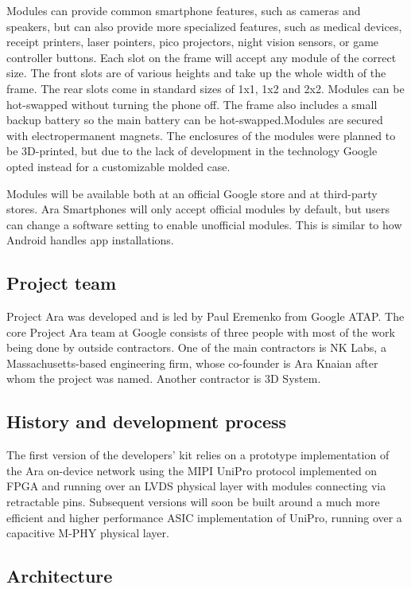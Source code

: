 Modules can provide common smartphone features, such as cameras and speakers, but can also provide more specialized features, such as medical devices, receipt printers, laser pointers, pico projectors, night vision sensors, or game controller buttons. Each slot on the frame will accept any module of the correct size. The front slots are of various heights and take up the whole width of the frame. The rear slots come in standard sizes of 1x1, 1x2 and 2x2. Modules can be hot-swapped without turning the phone off. The frame also includes a small backup battery so the main battery can be hot-swapped.Modules are secured with electropermanent magnets. The enclosures of the modules were planned to be 3D-printed, but due to the lack of development in the technology Google opted instead for a customizable molded case.

Modules will be available both at an official Google store and at third-party stores. Ara Smartphones will only accept official modules by default, but users can change a software setting to enable unofficial modules. This is similar to how Android handles app installations.

\subsection{Project team}

Project Ara was developed and is led by Paul Eremenko from Google ATAP. The core Project Ara team at Google consists of three people with most of the work being done by outside contractors. One of the main contractors is NK Labs, a Massachusetts-based engineering firm, whose co-founder is Ara Knaian after whom the project was named. Another contractor is 3D System.

\subsection{History and development process}

The first version of the developers' kit relies on a prototype implementation of the Ara on-device network using the MIPI UniPro protocol implemented on FPGA and running over an LVDS physical layer with modules connecting via retractable pins. Subsequent versions will soon be built around a much more efficient and higher performance ASIC implementation of UniPro, running over a capacitive M-PHY physical layer.
         
\subsection{Architecture}


